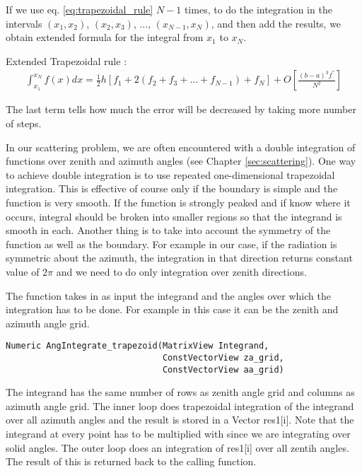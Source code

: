 If we use eq. \ref{eq:trapezoidal_rule} $N - 1$ times, to do the
integration in the intervals $(x_1, x_2)$,  $(x_2, x_3)$, ...,
$(x_{N-1}, x_N)$, and then add the results, we obtain extended formula
for the integral from $x_1$ to $x_N$.

Extended Trapezoidal rule :
\begin{eqnarray}
\label{eq:ext_trapezoidal_rule}
{\int_{x_1}^{x_N} f(x)dx}  = \frac{1}{2} h \left [f_1 + 2(f_2 + f_3 +
... +f_{N-1})+f_N \right] + O\left [ \frac {(b-a)^3 f^{''}}{N^2} \right]
\end{eqnarray}

The last term tells how much the error will be decreased by taking
more number of steps. 

\label{sec:integration:solid_angle}
In our scattering problem, we are often encountered with a double integration
of functions over zenith and azimuth angles (see Chapter
\ref{sec:scattering}).  One way to achieve
double integration is to use repeated
one-dimensional trapezoidal integration.  This is effective of course
only if the boundary is simple and the function is very smooth.  If
the function is strongly peaked and if know where it occurs, integral
should be broken into smaller regions so that the 
integrand is smooth in each.  Another thing is to take into account
the symmetry of the function as well as the boundary. For example in
our case, if the radiation is symmetric about the azimuth, the
integration in that direction returns constant value of $2 \pi$ and we
need to do only integration over zenith directions.  

The function takes in as input the integrand and the angles over which
the integration has to be done. For example in this case it can be the
zenith and azimuth angle
grid.
\begin{verbatim}  
Numeric AngIntegrate_trapezoid(MatrixView Integrand,
                               ConstVectorView za_grid,
                               ConstVectorView aa_grid)
\end{verbatim}
The integrand has the same number of rows as zenith angle grid
and columns as azimuth angle grid.  The inner loop does trapezoidal
integration of the integrand over all azimuth angles and the result is
stored in a Vector  res1[i]. Note that the integrand at every point
has to be multiplied with 
since we are integrating over solid angles.  The outer loop 
does an integration of res1[i] over all zentih angles.  The result of
this is returned back to the calling function.  



